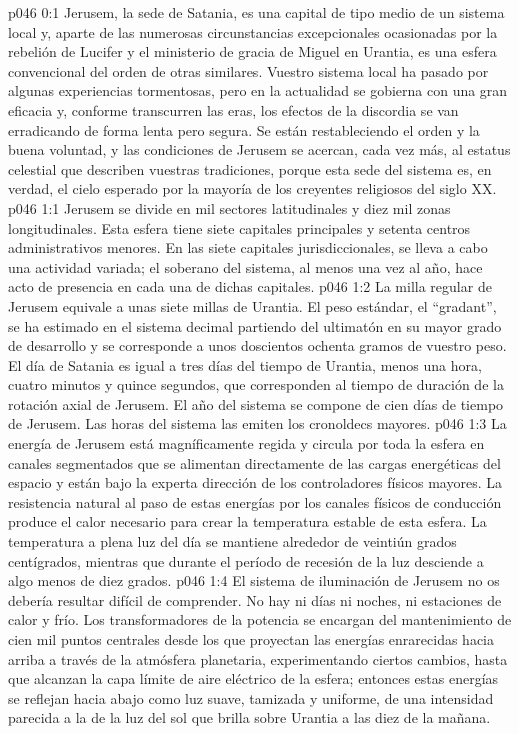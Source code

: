 \author{Arcángel}
\vs p046 0:1 Jerusem, la sede de Satania, es una capital de tipo medio de un sistema local y, aparte de las numerosas circunstancias excepcionales ocasionadas por la rebelión de Lucifer y el ministerio de gracia de Miguel en Urantia, es una esfera convencional del orden de otras similares. Vuestro sistema local ha pasado por algunas experiencias tormentosas, pero en la actualidad se gobierna con una gran eficacia y, conforme transcurren las eras, los efectos de la discordia se van erradicando de forma lenta pero segura. Se están restableciendo el orden y la buena voluntad, y las condiciones de Jerusem se acercan, cada vez más, al estatus celestial que describen vuestras tradiciones, porque esta sede del sistema es, en verdad, el cielo esperado por la mayoría de los creyentes religiosos del siglo XX.
\vs p046 1:1 Jerusem se divide en mil sectores latitudinales y diez mil zonas longitudinales. Esta esfera tiene siete capitales principales y setenta centros administrativos menores. En las siete capitales jurisdiccionales, se lleva a cabo una actividad variada; el soberano del sistema, al menos una vez al año, hace acto de presencia en cada una de dichas capitales.
\vs p046 1:2 \pc La milla regular de Jerusem equivale a unas siete millas de Urantia. El peso estándar, el “gradant”, se ha estimado en el sistema decimal partiendo del ultimatón en su mayor grado de desarrollo y se corresponde a unos doscientos ochenta gramos de vuestro peso. El día de Satania es igual a tres días del tiempo de Urantia, menos una hora, cuatro minutos y quince segundos, que corresponden al tiempo de duración de la rotación axial de Jerusem. El año del sistema se compone de cien días de tiempo de Jerusem. Las horas del sistema las emiten los cronoldecs mayores.
\vs p046 1:3 \pc La energía de Jerusem está magníficamente regida y circula por toda la esfera en canales segmentados que se alimentan directamente de las cargas energéticas del espacio y están bajo la experta dirección de los controladores físicos mayores. La resistencia natural al paso de estas energías por los canales físicos de conducción produce el calor necesario para crear la temperatura estable de esta esfera. La temperatura a plena luz del día se mantiene alrededor de veintiún grados centígrados, mientras que durante el período de recesión de la luz desciende a algo menos de diez grados.
\vs p046 1:4 \pc El sistema de iluminación de Jerusem no os debería resultar difícil de comprender. No hay ni días ni noches, ni estaciones de calor y frío. Los transformadores de la potencia se encargan del mantenimiento de cien mil puntos centrales desde los que proyectan las energías enrarecidas hacia arriba a través de la atmósfera planetaria, experimentando ciertos cambios, hasta que alcanzan la capa límite de aire eléctrico de la esfera; entonces estas energías se reflejan hacia abajo como luz suave, tamizada y uniforme, de una intensidad parecida a la de la luz del sol que brilla sobre Urantia a las diez de la mañana.
